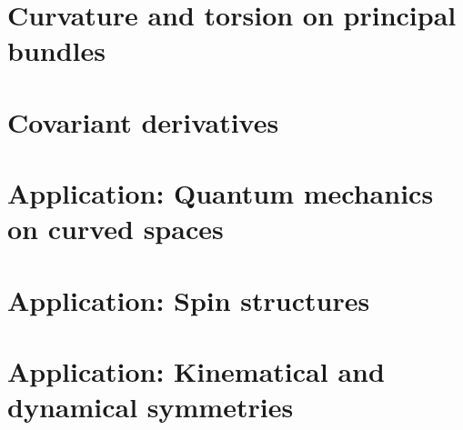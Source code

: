 \documentclass[
11pt, %
a4paper, %
twoside, %
headinclude,footinclude, %
]{scrartcl}
\begin{document}
\section{Curvature and torsion on principal bundles}



\section{Covariant derivatives}



\section{Application: Quantum mechanics on curved spaces}



\section{Application: Spin structures}



\section{Application: Kinematical and dynamical symmetries}





%


\end{document}
